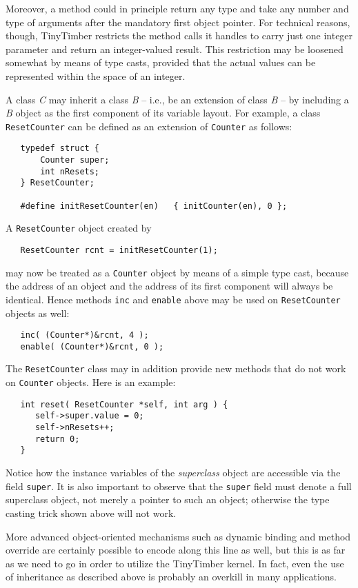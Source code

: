 \documentclass[12pt]{article}
\begin{document}
Moreover, a method could in principle return any type and take any number and type of arguments after the mandatory first object pointer.  For technical reasons, though, TinyTimber restricts the method calls it handles to carry just one integer parameter and return an integer-valued result.  This restriction may be loosened somewhat by means of type casts, provided that the actual values can be represented within the space of an integer.

A class {\em C} may inherit a class {\em B} -- i.e., be an extension of class {\em B} -- by including a {\em B} object as the first component of its variable layout.  For example, a class {\tt ResetCounter} can be defined as an extension of {\tt Counter} as follows:
\begin{verbatim}
   typedef struct {
       Counter super;
       int nResets;
   } ResetCounter;
   
   #define initResetCounter(en)   { initCounter(en), 0 };
\end{verbatim}
A {\tt ResetCounter} object created by
\begin{verbatim}
   ResetCounter rcnt = initResetCounter(1);
\end{verbatim}
may now be treated as a {\tt Counter} object by means of a simple type cast, because the address of an object and the address of its first component will always be identical.  Hence methods {\tt inc} and {\tt enable} above may be used on {\tt ResetCounter} objects as well:
\begin{verbatim}
   inc( (Counter*)&rcnt, 4 );
   enable( (Counter*)&rcnt, 0 );
\end{verbatim}
The {\tt ResetCounter} class may in addition provide new methods that do not work on {\tt Counter} objects.  Here is an example:
\begin{verbatim}
   int reset( ResetCounter *self, int arg ) {
      self->super.value = 0;
      self->nResets++;
      return 0;
   }
\end{verbatim}
Notice how the instance variables of the {\em superclass} object are accessible via the field {\tt super}.  It is also important to observe that the {\tt super} field must denote a full superclass object, not merely a pointer to such an object; otherwise the type casting trick shown above will not work.

More advanced object-oriented mechanisms such as dynamic binding and method override are certainly possible to encode along this line as well, but this is as far as we need to go in order to utilize the TinyTimber kernel.  In fact, even the use of inheritance as described above is probably an overkill in many applications.  
\end{document}
